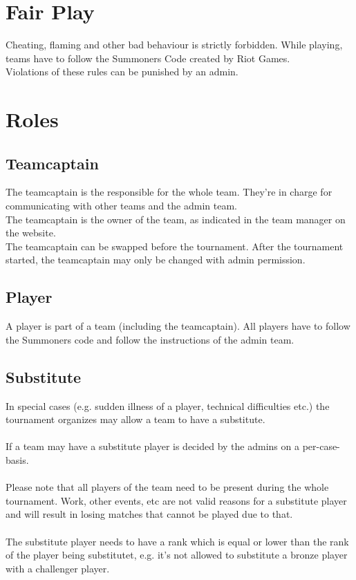\documentclass{article}
\begin{document}
\section{Fair Play}
Cheating, flaming and other bad behaviour is strictly forbidden. While playing, teams have to follow the Summoners Code created by Riot Games.
\\
Violations of these rules can be punished by an admin.

\section{Roles}
\subsection{Teamcaptain}
The teamcaptain is the responsible for the whole team. They're in charge for communicating with other teams and the admin team.
\\
The teamcaptain is the owner of the team, as indicated in the team manager on the website. 
\\
The teamcaptain can be swapped before the tournament. After the tournament started, the teamcaptain may only be changed with admin permission.

\subsection{Player}
A player is part of a team (including the teamcaptain). All players have to follow the Summoners code and follow the instructions of the admin team.

\subsection{Substitute}
In special cases (e.g. sudden illness of a player, technical difficulties etc.) the tournament organizes may allow a team to have a substitute.
\\
\\
If a team may have a substitute player is decided by the admins on a per-case-basis.
\\
\\
Please note that all players of the team need to be present during the whole tournament. Work, other events, etc are not valid reasons for a substitute player and will result in losing matches that cannot be played due to that.
\\
\\
The substitute player needs to have a rank which is equal or lower than the rank of the player being substitutet, e.g. it's not allowed to substitute a bronze player with a challenger player.
\end{document}
